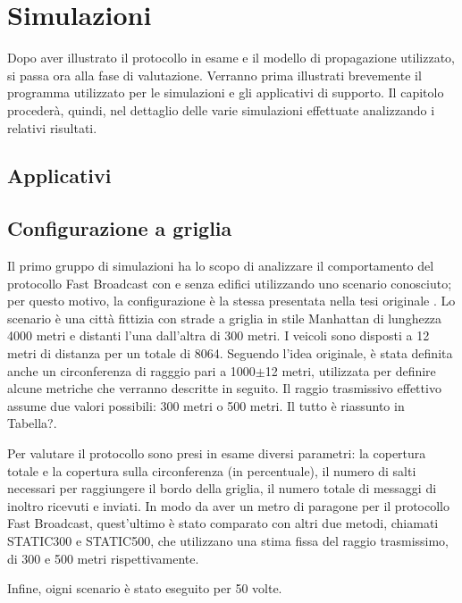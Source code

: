 %
\chapter{Simulazioni}
Dopo aver illustrato il protocollo in esame e il modello di propagazione utilizzato, si passa ora alla fase di valutazione.
Verranno prima illustrati brevemente il programma utilizzato per le simulazioni e gli applicativi di supporto.
Il capitolo procederà, quindi, nel dettaglio delle varie simulazioni effettuate analizzando i relativi risultati.
%
\section{Applicativi}
%
\section{Configurazione a griglia}
Il primo gruppo di simulazioni ha lo scopo di analizzare il comportamento del protocollo Fast Broadcast con e senza edifici utilizzando uno scenario conosciuto;
per questo motivo, la configurazione è la stessa presentata nella tesi originale \cite{Barichello2017propagazione}.
Lo scenario è una città fittizia con strade a griglia in stile Manhattan di lunghezza 4000 metri e distanti l'una dall'altra di 300 metri.
I veicoli sono disposti a 12 metri di distanza per un totale di 8064.
Seguendo l'idea originale, è stata definita anche un circonferenza di ragggio pari a 1000$\pm$12 metri, utilizzata per definire alcune metriche che verranno descritte in seguito.
Il raggio trasmissivo effettivo assume due valori possibili: 300 metri o 500 metri.
Il tutto è riassunto in Tabella?.

Per valutare il protocollo sono presi in esame diversi parametri: la copertura totale e la copertura sulla circonferenza (in percentuale),
il numero di salti necessari per raggiungere il bordo della griglia, il numero totale di messaggi di inoltro ricevuti e inviati.
In modo da aver un metro di paragone per il protocollo Fast Broadcast, quest'ultimo è stato comparato con altri due metodi, chiamati STATIC300 e STATIC500,
che utilizzano una stima fissa del raggio trasmissimo, di 300 e 500 metri rispettivamente.

Infine, oigni scenario è stato eseguito per 50 volte. %


